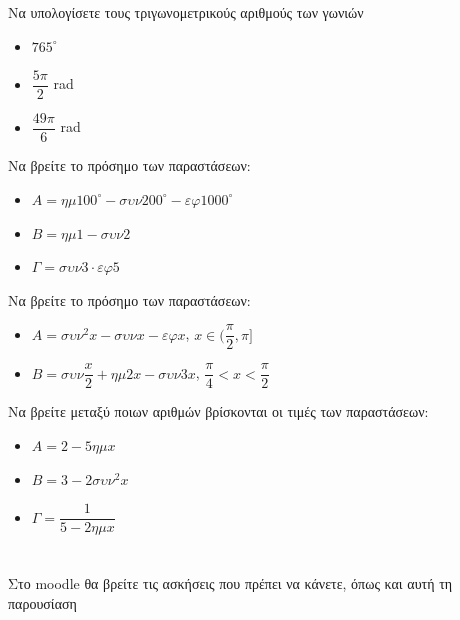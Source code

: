 \documentclass{../presentation}
\begin{document}
\begin{askisi}
  Να υπολογίσετε τους τριγωνομετρικούς αριθμούς των γωνιών
  \begin{itemize}
    \item<1-> $765^{\circ}$
    \item<2-> $\dfrac{5π}{2}$ rad
    \item<3-> $\dfrac{49π}{6}$ rad
  \end{itemize}
\end{askisi}

\begin{askisi}
  Να βρείτε το πρόσημο των παραστάσεων:
  \begin{itemize}
    \item<1-> $Α=ημ100^{\circ}-συν200^{\circ}-εφ1000^{\circ}$
    \item<2-> $Β=ημ1-συν2$
    \item<3-> $Γ=συν3 \cdot εφ5$
  \end{itemize}
\end{askisi}

\begin{askisi}
  Να βρείτε το πρόσημο των παραστάσεων:
  \begin{itemize}
    \item<1-> $Α=συν^2x-συνx-εφx$, $x\in (\dfrac{π}{2},π]$
    \item<2-> $Β=συν\dfrac{x}{2}+ημ2x-συν3x$, $\dfrac{π}{4}<x<\dfrac{π}{2}$
  \end{itemize}
\end{askisi}

\begin{askisi}
  Να βρείτε μεταξύ ποιων αριθμών βρίσκονται οι τιμές των παραστάσεων:
  \begin{itemize}
    \item<1-> $Α=2-5ημx$
    \item<2-> $Β=3-2συν^2x$
    \item<3-> $Γ=\dfrac{1}{5-2ημx}$
  \end{itemize}
\end{askisi}

\section{}
\begin{frame}
  Στο moodle θα βρείτε τις ασκήσεις που πρέπει να κάνετε, όπως και αυτή τη παρουσίαση
\end{frame}

\end{document}
